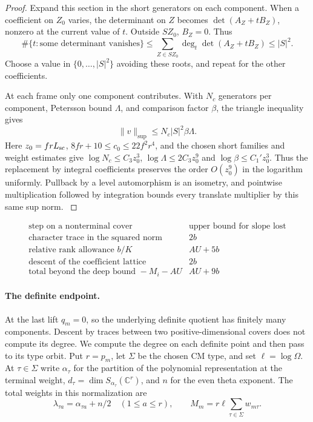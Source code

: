 \begin{proof}
Expand this section in the short generators on each component.
When a coefficient on \(Z_0\) varies, the determinant on \(Z\)
becomes \(\det(A_Z+tB_Z)\), nonzero at the current value of \(t\).
Outside \(S Z_0\), \(B_Z=0\). Thus
\[
 \#\{t:\text{some determinant vanishes}\}
   \le \sum_{Z\in S Z_0}\deg_t\det(A_Z+tB_Z)\le |S|^2 .
\]
Choose a value in \(\{0,\ldots,|S|^2\}\) avoiding these roots,
and repeat for the other coefficients.

At each frame only one component contributes. With \(N_c\)
generators per component, Petersson bound \(\Lambda\), and comparison
factor \(\beta\), the triangle inequality gives
\[
                   \|v\|_{\sup}\le N_c |S|^2\beta\Lambda .
\] Here \(z_0=frL_{\rm sc}\),
\(8fr+10\le c_0\le22 f^2r^4\), and the chosen short
families and weight estimates give
\(\log N_c\le C_3 z_0^3\), \(\log\Lambda\le2C_3z_0^9\)
and \(\log\beta\le C_1' z_0^3\).
Thus the replacement by integral coefficients preserves the
order \(O(z_0^9)\) in the logarithm uniformly. Pullback by a
level automorphism is an isometry, and pointwise multiplication
followed by integration bounds every translate multiplier by
this same sup norm. \label{cor:covolume-component-transfer-15}
\end{proof}

\begin{construction}
\[
\begin{array}{lc}
\text{step on a nonterminal cover}&\text{upper bound for slope lost}\\ \hline
\text{character trace in the squared norm}&2b\\
\text{relative rank allowance }b/K & AU+5b\\
\text{descent of the coefficient lattice}&2b\\ \hline
\text{total beyond the deep bound }-M_i-AU&AU+9b
\end{array}
\]
\caption{The losses in passing from the shifted deep lattice to the base type. Here \(A=C_F+C_U\), and \(0<b\le\min(K,U)\) on the selected family.}\label{fig:component-trace-budgets}
\end{construction}

\paragraph{The definite endpoint.}
At the last lift \(q_m=0\), so the underlying definite quotient has finitely many components. Descent by traces between two positive-dimensional covers does not compute its degree. We compute the degree on each definite point and then pass to its type orbit. Put \(r=p_m\), let \(\Sigma\) be the chosen CM type, and set \(\ell=\log\Omega\). At \(\tau\in\Sigma\) write \(\alpha_\tau\) for the partition of the polynomial representation at the terminal weight, \(d_\tau=\dim S_{\alpha_\tau}(\mathbb C^r)\), and \(n\) for the even theta exponent. The total weights in this normalization are
\[
 \lambda_{\tau a}=\alpha_{\tau a}+n/2\quad(1\le a\le r),\qquad
 M_m=r\ell\sum_{\tau\in\Sigma}w_{m\tau}.
\]

